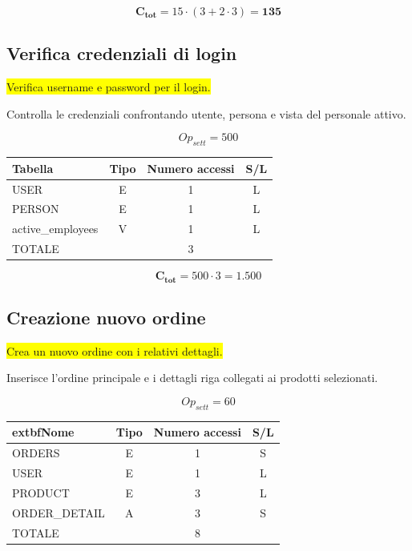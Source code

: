 \documentclass[a4paper,12pt]{report}
\begin{document}
$$\mathbf{C_{tot}} = 15 \cdot (3 + 2 \cdot 3) = \mathbf{135}$$

\subsection*{Verifica credenziali di login} \label{op19}
\colorbox{yellow}{Verifica username e password per il login.}

Controlla le credenziali confrontando utente, persona e vista del
personale attivo.

$$Op_{sett} = 500$$

\begin{table}[H]
  \centering
  \small
  \renewcommand{\arraystretch}{1.15}
  \begin{tabularx}{0.8\textwidth}{|X|c|c|c|}
    \hline
    \rowcolor{gray!20}
    \textbf{Tabella} & \textbf{Tipo} & \textbf{Numero accessi} & \textbf{S/L} \\
    \hline
    USER & E & 1 & L \\
    PERSON & E & 1 & L \\
    active\_employees & V & 1 & L \\
    \hline
    \rowcolor{gray!20}
    TOTALE & & 3 & \\
    \hline
  \end{tabularx}
  \vspace{-1em}
\end{table}

$$\mathbf{C_{tot}} = 500 \cdot 3 = \mathbf{1.500}$$

\subsection*{Creazione nuovo ordine} \label{op20}
\colorbox{yellow}{Crea un nuovo ordine con i relativi dettagli.}

Inserisce l'ordine principale e i dettagli riga collegati ai prodotti
selezionati.

$$Op_{sett} = 60$$

\begin{table}[H]
  \centering
  \small
  \renewcommand{\arraystretch}{1.15}
  \begin{tabularx}{0.8\textwidth}{|X|c|c|c|}
    \hline
    \rowcolor{gray!20}
    extbf{Nome} & \textbf{Tipo} & \textbf{Numero accessi} & \textbf{S/L} \\
    \hline
    ORDERS & E & 1 & S \\
    USER & E & 1 & L \\
    PRODUCT & E & 3 & L \\
    ORDER\_DETAIL & A & 3 & S \\
    \hline
    \rowcolor{gray!20}
    TOTALE & & 8 & \\
    \hline
  \end{tabularx}
  \vspace{-1em}
\end{table}
\end{document}

